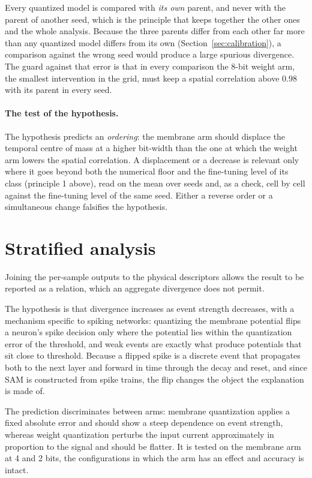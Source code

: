 Every quantized model is compared with
\emph{its own} parent, and never with the parent of another seed, which is the
principle that keeps together the other ones and the whole analysis.
Because the three
parents differ from each other far more than any quantized model differs from
its own (Section~\ref{sec:calibration}), a comparison against the wrong seed
would produce a large spurious divergence. The guard against that error is
that in every comparison the 8-bit weight arm, the smallest
intervention in the grid, must keep a spatial correlation above $0.98$ with its
parent in every seed.

\paragraph{The test of the hypothesis.} The hypothesis predicts an
\emph{ordering}: the membrane arm should displace the temporal centre of mass at
a higher bit-width than the one at which the weight arm lowers the spatial
correlation. A displacement or a decrease is relevant only where it goes beyond both
the numerical floor and the fine-tuning level of its class (principle 1 above),
read on the mean over seeds and, as a check, cell by cell against the
fine-tuning level of the same seed. Either a reverse order or a simultaneous
change falsifies the hypothesis.

\section{Stratified analysis}
\label{sec:stratified-method}

Joining the per-sample outputs to the physical descriptors allows the result to
be reported as a relation, which an aggregate divergence does not permit.

The hypothesis is that divergence increases as event strength decreases, with a
mechanism specific to spiking networks: quantizing the membrane potential flips a
neuron's spike decision only where the potential lies within the quantization
error of the threshold, and weak events are exactly what produce potentials that sit close to
threshold. Because a flipped spike is a discrete
event that propagates both to the next layer and forward in time through the
decay and reset, and since SAM is constructed from spike trains, the flip
changes the object the explanation is made of.

The prediction discriminates between arms: membrane quantization applies a fixed
absolute error and should show a steep dependence on event strength, whereas
weight quantization perturbs the input current approximately in proportion to the
signal and should be flatter. It is tested on the membrane arm at 4 and 2 bits,
the configurations in which the arm has an effect and accuracy is intact.

